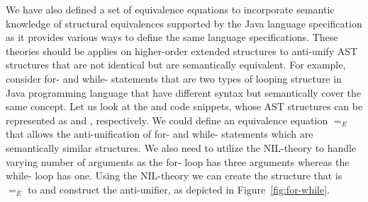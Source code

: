 We have also defined a set of equivalence equations to incorporate semantic knowledge of structural equivalences supported by the Java language specification as it provides various ways to define the same language specifications. These theories should be applies on higher-order extended structures to anti-unify AST structures that are not identical but are semantically equivalent. For example, consider for- and while- statements that are two types of looping structure in Java programming language that have different syntax but semantically cover the same concept. Let us look at the  and  code snippets, whose AST structures can be represented as  and , respectively. We could define an equivalence equation $=_E$ that allows the anti-unification of for- and while- statements which are semantically similar structures. We also need to utilize the NIL-theory to handle varying number of arguments as the for- loop has three arguments whereas the while- loop has one. Using the NIL-theory we can create the structure  that is $=_E$ to  and construct the anti-unifier,  as depicted in Figure~\ref{fig:for-while}.

